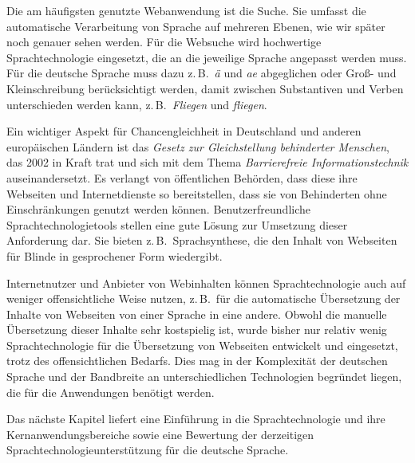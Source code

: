 \begin{multicols}{2}
Die am häufigsten genutzte Webanwendung ist die Suche. Sie umfasst die automatische Verarbeitung von Sprache auf mehreren Ebenen, wie wir später noch genauer sehen werden. Für die Websuche wird hochwertige Sprachtechnologie eingesetzt, die an die jeweilige Sprache angepasst werden muss. Für die deutsche Sprache muss dazu z.\,B.~\textit{ä} und \textit{ae} abgeglichen oder Groß- und Kleinschreibung berücksichtigt werden, damit zwischen Substantiven und Verben unterschieden werden kann, z.\,B.~\textit{Fliegen} und \textit{fliegen}. 

Ein wichtiger Aspekt für Chancengleichheit in Deutschland und anderen europäischen Ländern ist das \textit{Gesetz zur Gleichstellung behinderter Menschen}, das 2002 in Kraft trat und sich mit dem Thema \textit{Barrierefreie Informationstechnik} auseinandersetzt. Es verlangt von öffentlichen Behörden, dass diese ihre Webseiten und Internetdienste so bereitstellen, dass sie von Behinderten ohne Einschränkungen genutzt werden können. Benutzerfreundliche Sprachtechnologietools stellen eine gute Lösung zur Umsetzung dieser Anforderung dar. Sie bieten z.\,B.~Sprachsynthese, die den Inhalt von Webseiten für Blinde in gesprochener Form wiedergibt.

Internetnutzer und Anbieter von Webinhalten können Sprachtechnologie auch auf weniger offensichtliche Weise nutzen, z.\,B.~für die automatische Übersetzung der Inhalte von Webseiten von einer Sprache in eine andere. Obwohl die manuelle Übersetzung dieser Inhalte sehr kostspielig ist,  
wurde bisher nur relativ wenig Sprachtechnologie für die Übersetzung von Webseiten entwickelt und eingesetzt, trotz des offensichtlichen Bedarfs. 
Dies mag in der Komplexität der deutschen Sprache und der 
Bandbreite an unterschiedlichen Technologien begründet liegen, die für die Anwendungen benötigt werden. 

Das nächste Kapitel liefert eine Einführung in die Sprachtechnologie und ihre Kernanwendungsbereiche sowie eine Bewertung der derzeitigen Sprachtechnologieunterstützung für die deutsche Sprache.

\end{multicols}

\clearpage



